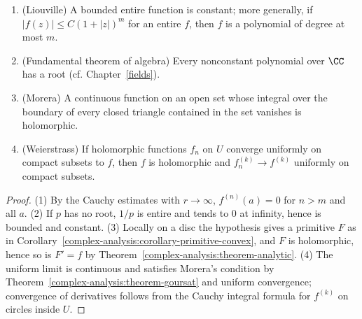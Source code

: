 \begin{corollary}\label{complex-analysis:corollary-liouville}
\begin{enumerate}
\item (Liouville) A bounded entire function is constant; more generally, if $|f(z)| \leq C(1 + |z|)^m$ for an entire $f$, then $f$ is a polynomial of degree at most $m$.
\item (Fundamental theorem of algebra) Every nonconstant polynomial over $\CC$ has a root (cf. Chapter~\ref{fields}).
\item (Morera) A continuous function on an open set whose integral over the boundary of every closed triangle contained in the set vanishes is holomorphic.
\item (Weierstrass) If holomorphic functions $f_n$ on $U$ converge uniformly on compact subsets to $f$, then $f$ is holomorphic and $f_n^{(k)} \to f^{(k)}$ uniformly on compact subsets.
\end{enumerate}
\end{corollary}

\begin{proof}
(1) By the Cauchy estimates with $r \to \infty$, $f^{(n)}(a) = 0$ for $n > m$ and all $a$. (2) If $p$ has no root, $1/p$ is entire and tends to $0$ at infinity, hence is bounded and constant. (3) Locally on
a disc the hypothesis gives a primitive $F$ as in Corollary~\ref{complex-analysis:corollary-primitive-convex}, and $F$ is holomorphic, hence so is $F' = f$ by
Theorem~\ref{complex-analysis:theorem-analytic}. (4) The uniform limit is continuous and satisfies Morera's condition by Theorem~\ref{complex-analysis:theorem-goursat} and uniform convergence; convergence
of derivatives follows from the Cauchy integral formula for $f^{(k)}$ on circles inside $U$.
\end{proof}

